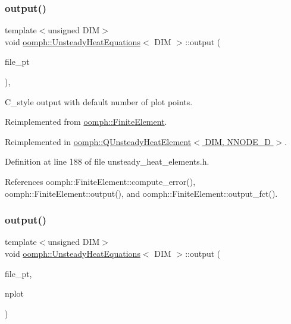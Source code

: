 \subsubsection{\texorpdfstring{output()}{output()}\hspace{0.1cm}{\footnotesize\ttfamily [3/4]}}
{\footnotesize\ttfamily template$<$unsigned D\+IM$>$ \\
void \hyperlink{classoomph_1_1UnsteadyHeatEquations}{oomph\+::\+Unsteady\+Heat\+Equations}$<$ D\+IM $>$\+::output (\begin{DoxyParamCaption}\item[{F\+I\+LE $\ast$}]{file\+\_\+pt }\end{DoxyParamCaption})\hspace{0.3cm}{\ttfamily [inline]}, {\ttfamily [virtual]}}



C\+\_\+style output with default number of plot points. 



Reimplemented from \hyperlink{classoomph_1_1FiniteElement_a72cddd09f8ddbee1a20a1ff404c6943e}{oomph\+::\+Finite\+Element}.



Reimplemented in \hyperlink{classoomph_1_1QUnsteadyHeatElement_a8fc87ff8818027bbbb9aa48b4ab5cd91}{oomph\+::\+Q\+Unsteady\+Heat\+Element$<$ D\+I\+M, N\+N\+O\+D\+E\+\_\+D $>$}.



Definition at line 188 of file unsteady\+\_\+heat\+\_\+elements.\+h.



References oomph\+::\+Finite\+Element\+::compute\+\_\+error(), oomph\+::\+Finite\+Element\+::output(), and oomph\+::\+Finite\+Element\+::output\+\_\+fct().

\mbox{\label{classoomph_1_1UnsteadyHeatEquations_aa63371c8600cb17a05b7bd00d89d1d2b}} 
\subsubsection{\texorpdfstring{output()}{output()}\hspace{0.1cm}{\footnotesize\ttfamily [4/4]}}
{\footnotesize\ttfamily template$<$unsigned D\+IM$>$ \\
void \hyperlink{classoomph_1_1UnsteadyHeatEquations}{oomph\+::\+Unsteady\+Heat\+Equations}$<$ D\+IM $>$\+::output (\begin{DoxyParamCaption}\item[{F\+I\+LE $\ast$}]{file\+\_\+pt,  }\item[{const unsigned \&}]{nplot }\end{DoxyParamCaption})\hspace{0.3cm}{\ttfamily [virtual]}}




